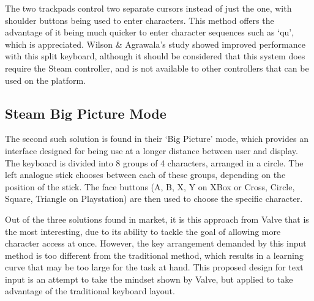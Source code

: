\documentclass[requirements.tex]{subfiles}
\begin{document}
The two trackpads control two separate cursors instead of just the one, with
shoulder buttons being used to enter characters. This method offers the
advantage of it being much quicker to enter character sequences such as `qu',
which is appreciated. Wilson \& Agrawala's study showed improved performance
with this split keyboard, although it should be considered that this system does
require the Steam controller, and is not available to other controllers that can
be used on the platform.

\subsection{Steam Big Picture Mode} %
\label{sub:steam_big_picture_mode}
The second such solution is found in their `Big Picture' mode, which provides an
interface designed for being use at a longer distance between user and display.
The keyboard is divided into 8 groups of 4 characters, arranged in a circle.
The left analogue stick chooses between each of these groups, depending on the
position of the stick. The face buttons (A, B, X, Y on XBox or Cross, Circle,
Square, Triangle on Playstation) are then used to choose the specific character.

Out of the three solutions found in market, it is this approach from Valve that
is the most interesting, due to its ability to tackle the goal of allowing
more character access at once. However, the key arrangement demanded by this
input method is too different from the traditional method, which results in a
learning curve that may be too large for the task at hand. This proposed design
for text input is an attempt to take the mindset shown by Valve, but applied to
take advantage of the traditional keyboard layout.
\end{document}
